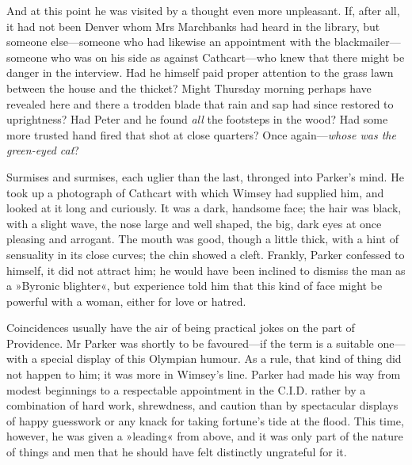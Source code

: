And at this point he was visited by a thought even more unpleasant. If, after all, it had not been Denver whom Mrs Marchbanks had heard in the library, but someone else—someone who had likewise an appointment with the blackmailer—someone who was on his side as against Cathcart—who knew that there might be danger in the interview. Had he himself paid proper attention to the grass lawn between the house and the thicket?  Might Thursday morning perhaps have revealed here and there a trodden blade that rain and sap had since restored to uprightness? Had Peter and he found \textit{all} the footsteps in the wood? Had some more trusted hand fired that shot at close quarters? Once again—\textit{whose was the green-eyed cat}?

Surmises and surmises, each uglier than the last, thronged into Parker's mind. He took up a photograph of Cathcart with which Wimsey had supplied him, and looked at it long and curiously. It was a dark, handsome face; the hair was black, with a slight wave, the nose large and well shaped, the big, dark eyes at once pleasing and arrogant. The mouth was good, though a little thick, with a hint of sensuality in its close curves; the chin showed a cleft. Frankly, Parker confessed to himself, it did not attract him; he would have been inclined to dismiss the man as a »Byronic blighter«, but experience told him that this kind of face might be powerful with a woman, either for love or hatred.

Coincidences usually have the air of being practical jokes on the part of Providence. Mr Parker was shortly to be favoured—if the term is a suitable one—with a special display of this Olympian humour. As a rule, that kind of thing did not happen to him; it was more in Wimsey's line. Parker had made his way from modest beginnings to a respectable appointment in the C.I.D. rather by a combination of hard work, shrewdness, and caution than by spectacular displays of happy guesswork or any knack for taking fortune's tide at the flood. This time, however, he was given a »leading« from above, and it was only part of the nature of things and men that he should have felt distinctly ungrateful for it.

